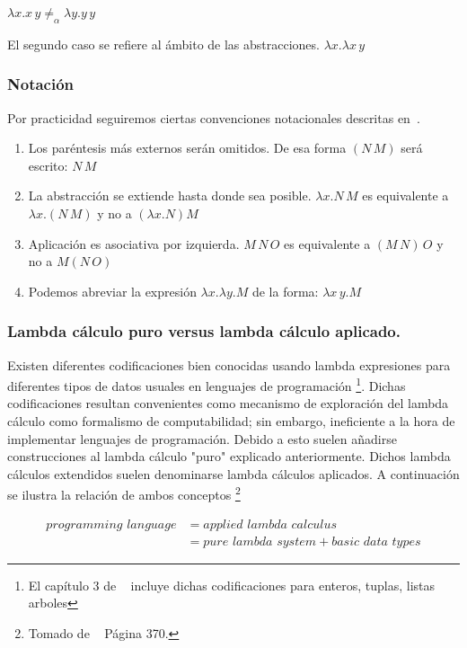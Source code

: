 \begin{ejem}
$\lambda x . x\,y \neq_{\alpha} \lambda y . y\,y$
\end{ejem}

El segundo caso se refiere al ámbito de las abstracciones.
$\lambda x . \lambda x\,y$

\subsubsection{Notación}

Por practicidad seguiremos ciertas convenciones notacionales descritas
en~\cite{selinger:lambda}.

\begin{enumerate}
\item Los paréntesis más externos serán omitidos. De esa forma $(N\,M)$ será escrito:
  $N\,M$
\item La abstracción se extiende hasta donde sea posible. $\lambda x . N\,M$ es
  equivalente a $\lambda x.(N\,M)$ y no a $( \lambda x . N) M$
\item Aplicación es asociativa por izquierda. $M\,N\,O$ es equivalente a $(M\,N)\,O$
  y no a $M(N\,O)$
\item Podemos abreviar la expresión $\lambda x . \lambda y . M$ de la forma: $\lambda x\,y . M $

\end{enumerate}

\subsubsection{Lambda cálculo puro versus lambda cálculo aplicado.} 

Existen diferentes codificaciones bien conocidas usando lambda expresiones para
diferentes tipos de datos usuales en lenguajes de programación
\footnote{El capítulo 3 de ~\cite{selinger:lambda} incluye dichas codificaciones para
  enteros, tuplas, listas arboles}.  Dichas codificaciones resultan convenientes como
mecanismo de exploración del lambda cálculo como formalismo de computabilidad; sin
embargo, ineficiente a la hora de implementar lenguajes de programación. Debido a
esto suelen añadirse construcciones al lambda cálculo "puro" explicado
anteriormente. Dichos lambda cálculos extendidos suelen denominarse lambda cálculos
aplicados. A continuación se ilustra la relación de ambos conceptos
\footnote{Tomado de ~\cite{leeuwen:handbook} Página 370.}

\begin{equation*}
  \begin{split}
    programming\,\,language& = applied\,\,lambda\,\,calculus \\
    & = pure\,\,lambda\,\,system + basic\,\,data\,\,types
  \end{split}
\end{equation*} 

